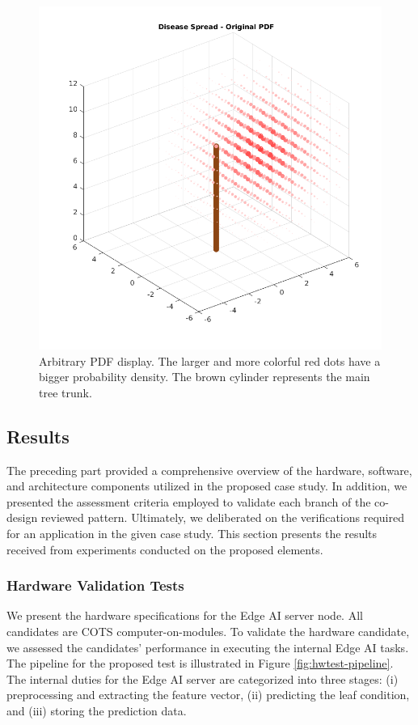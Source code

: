 \begin{figure}[h!]
    \centering
    \includegraphics[width = .7\linewidth]{Figures/arb-pdf.png}
    \caption{Arbitrary PDF display. The larger and more colorful red dots have a bigger probability density. {\color{black}The brown cylinder represents the main tree trunk.}}
    \label{fig:arb_pdf}
\end{figure}

\subsection{Results}

The preceding part provided a comprehensive overview of the hardware, software, and architecture components utilized in the proposed case study. In addition, we presented the assessment criteria employed to validate each branch of the co-design reviewed pattern. Ultimately, we deliberated on the verifications required for an application in the given case study. This section presents the results received from experiments conducted on the proposed elements.

\subsubsection{Hardware Validation Tests}

We present the hardware specifications for the Edge AI server node. All candidates are COTS computer-on-modules. To validate the hardware candidate, we assessed the candidates' performance in executing the internal Edge AI tasks. The pipeline for the proposed test is illustrated in Figure \ref{fig:hwtest-pipeline}. The internal duties for the Edge AI server are categorized into three stages: (i) preprocessing and extracting the feature vector, (ii) predicting the leaf condition, and (iii) storing the prediction data. 


